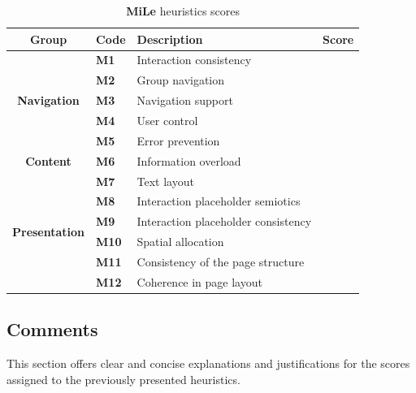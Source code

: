 \begin{table}[htp!]
    \centering
    \begin{tabular}{ |c|l|l|c| }
        \hline
        \textbf{Group} & \textbf{Code} & \textbf{Description} & \textbf{Score}\\
        \hline
        \multirow{5}{*}{\textbf{Navigation}} & \textbf{M1} & Interaction consistency & \textbf{\color{unicefRed}{2}}\\
        \cline{2-4}
        & \textbf{M2} & Group navigation & \textbf{\color{unicefGreen}{4}}\\
        \cline{2-4}
        & \textbf{M3} & Navigation support & \textbf{\color{unicefGreen}{4}}\\
        \cline{2-4}
        & \textbf{M4} & User control & \textbf{\color{unicefOrange}{3}}\\
        \cline{2-4}
        & \textbf{M5} & Error prevention & \textbf{\color{unicefGreen}{4}}\\
        \hline
        \textbf{Content} & \textbf{M6} & Information overload & \textbf{\color{unicefOrange}{3}}\\
        \hline
        \multirow{6}{*}{\textbf{Presentation}} & \textbf{M7} & Text layout & \textbf{\color{unicefGreen}{5}}\\
        \cline{2-4}
        & \textbf{M8} & Interaction placeholder semiotics & \textbf{\color{unicefGreen}{4}}\\
        \cline{2-4}
        & \textbf{M9} & Interaction placeholder consistency & \textbf{\color{unicefGreen}{4}}\\
        \cline{2-4}
        & \textbf{M10} & Spatial allocation & \textbf{\color{unicefOrange}{3}}\\
        \cline{2-4}
        & \textbf{M11} & Consistency of the page structure & \textbf{\color{unicefGreen}{4}}\\
        \cline{2-4}
        & \textbf{M12} & Coherence in page layout & \textbf{\color{unicefGreen}{5}}\\
        \hline
    \end{tabular}
    \caption{\textbf{MiLe} heuristics scores}
\end{table}
\newpage
\subsection{Comments}
This section offers clear and concise explanations and justifications for the scores assigned to the previously presented heuristics.
